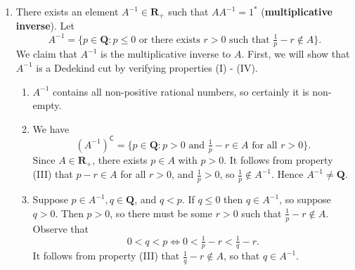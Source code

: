 \documentclass[12pt]{article}
\newcommand{\Q}{\mathbf{Q}}
\newcommand{\R}{\mathbf{R}}
\theoremstyle{definition}
\begin{document}
\begin{enumerate}[label = (M\arabic*)]
    \item There exists an element \( A^{-1} \in \R_+ \) such that \( AA^{-1} = 1^* \) (\textbf{multiplicative inverse}). Let
    \[
        A^{-1} = \{ p \in \Q : p \leq 0 \text{ or there exists } r > 0 \text{ such that } \tfrac{1}{p} - r \not\in A \}.
    \]
    We claim that \( A^{-1} \) is the multiplicative inverse to \( A \). First, we will show that \( A^{-1} \) is a Dedekind cut by verifying properties (I) - (IV).
    
    \begin{enumerate}[label = (\Roman*)]
        \item \( A^{-1} \) contains all non-positive rational numbers, so certainly it is non-empty.

        \item We have
        \[
            \left(A^{-1}\right)^{\mathsf{C}} = \{ p \in \Q : p > 0 \text{ and } \tfrac{1}{p} - r \in A \text{ for all } r > 0 \}.
        \]
        Since \( A \in \R_+ \), there exists \( p \in A \) with \( p > 0 \). It follows from property (III) that \( p - r \in A \) for all \( r > 0 \), and \( \tfrac{1}{p} > 0 \), so \( \tfrac{1}{p} \not\in A^{-1} \). Hence \( A^{-1} \neq \Q \).

        \item Suppose \( p \in A^{-1}, q \in \Q \), and \( q < p \). If \( q \leq 0 \) then \( q \in A^{-1} \), so suppose \( q > 0 \). Then \( p > 0 \), so there must be some \( r > 0 \) such that \( \tfrac{1}{p} - r \not\in A \). Observe that
        \[
            0 < q < p \iff 0 < \tfrac{1}{p} - r < \tfrac{1}{q} - r.
        \]
        It follows from property (III) that \( \tfrac{1}{q} - r \not\in A \), so that \( q \in A^{-1} \).


\end{enumerate}
\end{enumerate}
\end{document}
